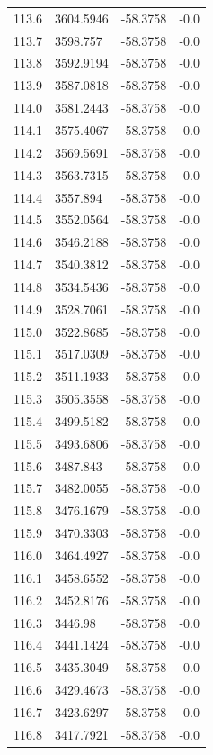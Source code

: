 \begin{table}[H]
\begin{tabular}{llll}
113.6 & 3604.5946 & -58.3758 & -0.0 \\
113.7 & 3598.757 & -58.3758 & -0.0 \\
113.8 & 3592.9194 & -58.3758 & -0.0 \\
113.9 & 3587.0818 & -58.3758 & -0.0 \\
114.0 & 3581.2443 & -58.3758 & -0.0 \\
114.1 & 3575.4067 & -58.3758 & -0.0 \\
114.2 & 3569.5691 & -58.3758 & -0.0 \\
114.3 & 3563.7315 & -58.3758 & -0.0 \\
114.4 & 3557.894 & -58.3758 & -0.0 \\
114.5 & 3552.0564 & -58.3758 & -0.0 \\
114.6 & 3546.2188 & -58.3758 & -0.0 \\
114.7 & 3540.3812 & -58.3758 & -0.0 \\
114.8 & 3534.5436 & -58.3758 & -0.0 \\
114.9 & 3528.7061 & -58.3758 & -0.0 \\
115.0 & 3522.8685 & -58.3758 & -0.0 \\
115.1 & 3517.0309 & -58.3758 & -0.0 \\
115.2 & 3511.1933 & -58.3758 & -0.0 \\
115.3 & 3505.3558 & -58.3758 & -0.0 \\
115.4 & 3499.5182 & -58.3758 & -0.0 \\
115.5 & 3493.6806 & -58.3758 & -0.0 \\
115.6 & 3487.843 & -58.3758 & -0.0 \\
115.7 & 3482.0055 & -58.3758 & -0.0 \\
115.8 & 3476.1679 & -58.3758 & -0.0 \\
115.9 & 3470.3303 & -58.3758 & -0.0 \\
116.0 & 3464.4927 & -58.3758 & -0.0 \\
116.1 & 3458.6552 & -58.3758 & -0.0 \\
116.2 & 3452.8176 & -58.3758 & -0.0 \\
116.3 & 3446.98 & -58.3758 & -0.0 \\
116.4 & 3441.1424 & -58.3758 & -0.0 \\
116.5 & 3435.3049 & -58.3758 & -0.0 \\
116.6 & 3429.4673 & -58.3758 & -0.0 \\
116.7 & 3423.6297 & -58.3758 & -0.0 \\
116.8 & 3417.7921 & -58.3758 & -0.0 \\

\end{tabular}
\end{table}
